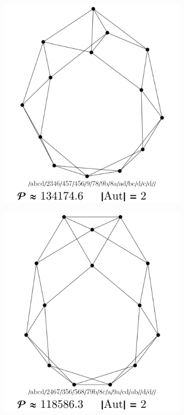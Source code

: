 \documentclass[11pt,a4paper]{article}
\renewcommand{\|}{\rule[-0.4ex]{0.2ex}{1.2em}}
\begin{document}
\begin{figure}[htb]
\begin{subfigure}[b]{.24 \textwidth}
		\subcaption{}
	\end{subfigure}
	\begin{subfigure}[b]{.24 \textwidth}
		\includegraphics[width=\linewidth]{largest_12_3}
		\subcaption{}
	\end{subfigure}
	\begin{subfigure}[b]{.24 \textwidth}
		\includegraphics[width=\linewidth]{largest_12_4}
		\subcaption{}
	\end{subfigure}
	

\end{figure}
\end{document}
